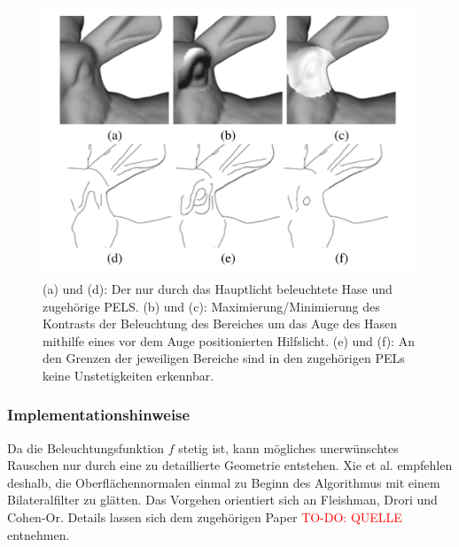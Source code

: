 \documentclass{paperStyle}
\newcommand\todo[1]{\textcolor{red}{#1}}
\begin{document}
\begin{figure}
	\centering
		\includegraphics[width=0.7\linewidth]{rabbit.png}
	\caption{(a) und (d): Der nur durch das Hauptlicht beleuchtete Hase und zugehörige PELS. (b) und (c): Maximierung/Minimierung des Kontrasts der Beleuchtung des Bereiches um das Auge des Hasen mithilfe eines vor dem Auge positionierten Hilfslicht. (e) und (f): An den Grenzen der jeweiligen Bereiche sind in den zugehörigen PELs keine Unstetigkeiten erkennbar.}
	\label{fig:rabbit}
\end{figure}
\label{beleuchtung}
\subsubsection{Implementationshinweise}
\label{pel-impl}
Da die Beleuchtungsfunktion $f$ stetig ist, kann mögliches unerwünschtes Rauschen nur durch eine zu detaillierte Geometrie entstehen. Xie et al. empfehlen deshalb, die Oberflächennormalen einmal zu Beginn des Algorithmus mit einem Bilateralfilter zu glätten. Das Vorgehen orientiert sich an Fleishman, Drori und Cohen-Or. Details lassen sich dem zugehörigen Paper \todo{TO-DO: QUELLE} entnehmen. 
\end{document}
